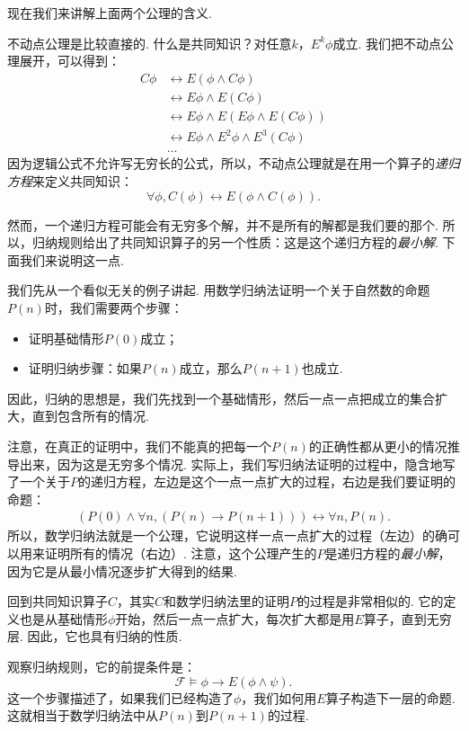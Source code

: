 现在我们来讲解上面两个公理的含义. 

不动点公理是比较直接的. 什么是共同知识？对任意$k$，$E^k\phi$成立. 我们把不动点公理展开，可以得到：
\begin{align*}
    C\phi&\leftrightarrow E(\phi\wedge C\phi)\\
    &\leftrightarrow E\phi\wedge E(C\phi)\\
    &\leftrightarrow E\phi\wedge E(E\phi\wedge E(C\phi))\\
    &\leftrightarrow E\phi\wedge E^2\phi\wedge E^3(C\phi)\\
    &\dots
\end{align*}
因为逻辑公式不允许写无穷长的公式，所以，不动点公理就是在用一个算子的\textit{递归方程}来定义共同知识：
\[\forall\phi,C(\phi)\leftrightarrow E(\phi\wedge C(\phi)). \]

然而，一个递归方程可能会有无穷多个解，并不是所有的解都是我们要的那个. 所以，归纳规则给出了共同知识算子的另一个性质：这是这个递归方程的\textit{最小解}. 下面我们来说明这一点. 

我们先从一个看似无关的例子讲起. 用数学归纳法证明一个关于自然数的命题$P(n)$时，我们需要两个步骤：
\begin{itemize}
    \item 证明基础情形$P(0)$成立；
    \item 证明归纳步骤：如果$P(n)$成立，那么$P(n+1)$也成立. 
\end{itemize}
因此，归纳的思想是，我们先找到一个基础情形，然后一点一点把成立的集合扩大，直到包含所有的情况. 

注意，在真正的证明中，我们不能真的把每一个$P(n)$的正确性都从更小的情况推导出来，因为这是无穷多个情况. 实际上，我们写归纳法证明的过程中，隐含地写了一个关于$P$的递归方程，左边是这个一点一点扩大的过程，右边是我们要证明的命题：
\begin{align*}
    (P(0)\wedge\forall n,(P(n)\to P(n+1)))\leftrightarrow\forall n,P(n).
\end{align*}
所以，数学归纳法就是一个公理，它说明这样一点一点扩大的过程（左边）的确可以用来证明所有的情况（右边）. 注意，这个公理产生的$P$是递归方程的\textit{最小解}，因为它是从最小情况逐步扩大得到的结果. 

回到共同知识算子$C$，其实$C$和数学归纳法里的证明$P$的过程是非常相似的. 它的定义也是从基础情形$\phi$开始，然后一点一点扩大，每次扩大都是用$E$算子，直到无穷层. 因此，它也具有归纳的性质. 

观察归纳规则，它的前提条件是：
\[\mathcal F\vDash \phi\to E(\phi\wedge\psi).\]
这一个步骤描述了，如果我们已经构造了$\phi$，我们如何用$E$算子构造下一层的命题. 这就相当于数学归纳法中从$P(n)$到$P(n+1)$的过程. 

